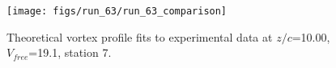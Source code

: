 \begin{figure}[H]
\centering
\texttt{[image: figs/run\_63/run\_63\_comparison]}
\caption{Theoretical vortex profile fits to experimental data at $z/c$=10.00, $V_{free}$=19.1, station 7.}
\label{fig:run_63_comparison}
\end{figure}



